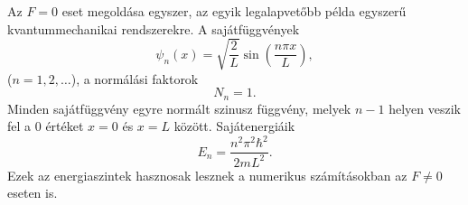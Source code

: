 Az $F=0$ eset megoldása egyszer, az egyik legalapvetőbb példa egyszerű kvantummechanikai rendszerekre. A sajátfüggvények
\begin{equation}
	\psi_n(x) = \sqrt{\frac{2}{L}}\sin\left(\frac{n\pi x}{L}\right),
\end{equation}
($n=1,2,\dots$), a normálási faktorok
\begin{equation}
	N_n = 1.
\end{equation}
Minden sajátfüggvény egyre normált szinusz függvény, melyek $n-1$ helyen veszik fel a $0$ értéket $x=0$ és $x=L$ között. Sajátenergiáik
\begin{equation}
	E_n = \frac{n^2\pi^2\hbar^2}{2mL^2}.
\end{equation}
Ezek az energiaszintek hasznosak lesznek a numerikus számításokban az $F\neq 0$ eseten is. 